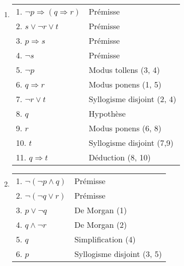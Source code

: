 \begin{enumerate}
	\item  \hspace{1em}
    \begin{center}
    \begin{tabular}{|l|l|}
    \hline
    1. $\lnot p \Rightarrow (q \Rightarrow r)$ & Prémisse \\
    2. $s \lor \lnot r \lor t$ & Prémisse \\
    3. $p \Rightarrow s$ & Prémisse \\
    4. $\lnot s$ & Prémisse \\
    5. $\lnot p$ & Modus tollens (3, 4) \\
    6. $q \Rightarrow r$ & Modus ponens (1, 5) \\
    7. $\lnot r \lor t$ & Syllogisme disjoint (2, 4) \\
    \hspace{0.5cm} 8. $q$ & Hypothèse \\
    \hspace{0.5cm} 9. $r$ & Modus ponens (6, 8) \\
    \hspace{0.5cm} 10. $t$ & Syllogisme disjoint (7,9) \\
    11. $q \Rightarrow t$ & Déduction (8, 10) \\
    \hline
    \end{tabular}
    \end{center}

	\item  \hspace{1em}
    \begin{center}
    \begin{tabular}{|l|l|}
    \hline
    1. $\lnot ( \lnot p \land q)$ & Prémisse \\
    2. $\lnot ( \lnot q \lor r)$ & Prémisse \\
    3. $p \lor \lnot q$ & De Morgan (1) \\
    4. $q \land \lnot r$ & De Morgan (2) \\
    5. $q$ & Simplification (4) \\
    6. $p$ & Syllogisme disjoint (3, 5) \\
    \hline
    \end{tabular}
    \end{center}


\end{enumerate}
